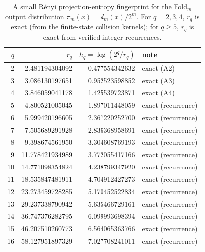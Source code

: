 \begin{table}[H]
\centering
\scriptsize
\setlength{\tabcolsep}{6pt}
\caption{A small R\'enyi projection-entropy fingerprint for the Fold$_m$ output distribution $\pi_m(x)=d_m(x)/2^m$. For $q=2,3,4$, $r_q$ is exact (from the finite-state collision kernels); for $q\ge 5$, $r_q$ is exact from verified integer recurrences.}
\label{tab:fold_collision_renyi_spectrum}
\begin{tabular}{r r r l}
\toprule
$q$ & $r_q$ & $h_q=\log(2^q/r_q)$ & note\\
\midrule
2 & 2.481194304092 & 0.477554342632 & exact (A2)\\
3 & 3.086130197651 & 0.952523598852 & exact (A3)\\
4 & 3.846059041178 & 1.425539723871 & exact (A4)\\
5 & 4.800521005045 & 1.897011448059 & exact (recurrence)\\
6 & 5.999420196605 & 2.367220252700 & exact (recurrence)\\
7 & 7.505689291928 & 2.836368958691 & exact (recurrence)\\
8 & 9.398674561950 & 3.304608769193 & exact (recurrence)\\
9 & 11.778421934989 & 3.772055417166 & exact (recurrence)\\
10 & 14.771098354824 & 4.238799347920 & exact (recurrence)\\
11 & 18.535847481911 & 4.704912427273 & exact (recurrence)\\
12 & 23.273459728285 & 5.170452522834 & exact (recurrence)\\
13 & 29.237338790942 & 5.635466729161 & exact (recurrence)\\
14 & 36.747376282795 & 6.099993698394 & exact (recurrence)\\
15 & 46.207510260773 & 6.564065363766 & exact (recurrence)\\
16 & 58.127951897329 & 7.027708241011 & exact (recurrence)\\
\bottomrule
\end{tabular}
\end{table}
